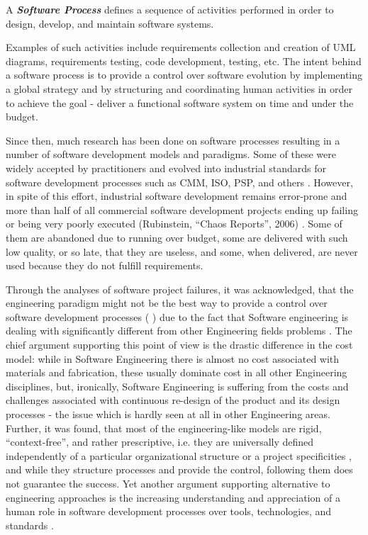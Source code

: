 \begin{defn}\label{def_process}
A \textbf{\textit{Software Process}} defines a sequence of activities performed in order 
to design, develop, and maintain software systems.
\end{defn}
Examples of such activities include requirements collection and creation of UML diagrams, 
requirements testing, code development,  testing, etc. The intent behind a software process is 
to provide a control over software evolution by implementing a global strategy and by structuring
and coordinating human activities in order to achieve the goal - deliver a functional software system 
on time and under the budget. 

Since then, much research has been done on software processes resulting in a number
of software development models and paradigms. Some of these were widely accepted by practitioners 
and evolved into industrial standards for software development processes such as CMM, ISO, PSP, 
and others \cite{citeulike:5043104}. However, in spite of this effort, industrial software 
development remains error-prone and more than half of all 
commercial software development projects ending up failing or being very poorly executed 
(Rubinstein, ``Chaos Reports'', 2006) \cite{chaos2006}. Some of them are abandoned due to running 
over budget, some are delivered with such low quality, or so late, that they are useless, and some, 
when delivered, are never used because they do not fulfill requirements. 

Through the analyses of software project failures, it was acknowledged, that the engineering 
paradigm might not be the best way to provide a control over software development processes 
(\cite{citeulike:3729379} \cite{citeulike:5203446}) due to the fact that Software engineering 
is dealing with significantly different from other Engineering fields problems \cite{citeulike:2207657} .
The chief argument supporting this point of view is the drastic difference in the cost model:
while in Software Engineering there is almost no cost associated with materials and 
fabrication, these usually dominate cost in all other Engineering disciplines, but, 
ironically, Software Engineering is suffering from the costs and challenges associated with 
continuous re-design of the product and its design processes - the issue which is 
hardly seen at all in other Engineering areas. 
Further, it was found, that most of the engineering-like models are rigid, ``context-free'',
and rather prescriptive, i.e. they are universally defined independently of a particular 
organizational structure or a project specificities \cite{sacchi_2001}, and while they 
structure processes and provide the control, following them does not guarantee the success.
Yet another argument supporting alternative to engineering approaches is the increasing 
understanding and appreciation of a human role in software development processes over tools, 
technologies, and standards \cite{citeulike:6580825} \cite{citeulike:149387}
\cite{1605185} \cite{citeulike:113403} \cite{1605188} \cite{citeulike:12743107}. 

